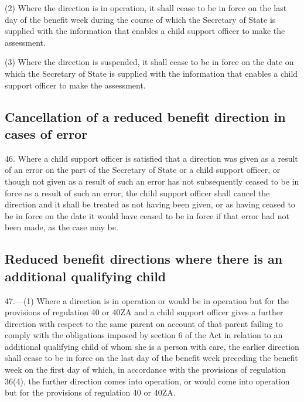 \documentclass[a4paper]{article}
\begin{document}
(2) Where the direction is in operation, it shall cease to be in force on the last day of the benefit week during the course of which the Secretary of State is supplied with the information that enables a child support officer to make the assessment.

(3) Where the direction is suspended, it shall cease to be in force on the date on which the Secretary of State is supplied with the information that enables a child support officer to make the assessment.

\subsection[46. Cancellation of a reduced benefit direction in cases of error]{Cancellation of a reduced benefit direction in cases of error}

46.  Where a child support officer is satisfied that a direction was given as a result of an error on the part of the Secretary of State or a child support officer, or though not given as a result of such an error has not subsequently ceased to be in force as a result of such an error, the child support officer shall cancel the direction and it shall be treated as not having been given, or as having ceased to be in force on the date it would have ceased to be in force if that error had not been made, as the case may be.

\subsection[47. Reduced benefit directions where there is an additional qualifying child]{Reduced benefit directions where there is an additional qualifying child}

47.—(1) Where a direction is in operation or would be in operation but for the provisions of regulation 40 
or 40ZA  %
and a child support officer gives a further direction with respect to the same parent on account of that parent failing to comply with the obligations imposed by section 6 of the Act in relation to an additional qualifying child of whom she is a person with care, the earlier direction shall cease to be in force on the last day of the benefit week preceding the benefit week on the first day of which, in accordance with the provisions of regulation 36(4), the further direction comes into operation, or would come into operation but for the provisions of regulation 40
or 40ZA.  %
\end{document}
